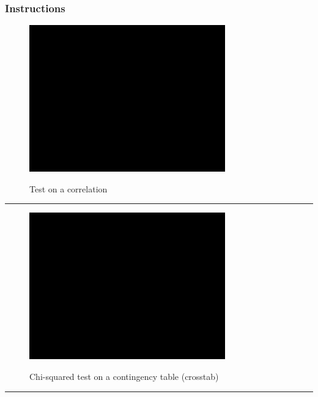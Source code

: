 \documentclass[a4paper]{book}
\theoremstyle{definition}
\theoremstyle{definition}
\theoremstyle{definition}
\theoremstyle{remark}
\begin{document}
\subsubsection*{Instructions}\label{instructions-13}

\begin{figure}[H]
\href{https://www.youtube.com/embed/2g3Oyfe76h0}{\includegraphics[width=320px]{GentleIntro_files/figure-latex/SPSScorrelation-1} }\caption{Test on a correlation}\label{fig:SPSScorrelation}
\end{figure}

\begin{center}\rule{0.5\linewidth}{\linethickness}\end{center}

\begin{figure}[H]
\href{https://www.youtube.com/embed/Nqtg8q-S0k8}{\includegraphics[width=320px]{GentleIntro_files/figure-latex/SPSSchisqcross-1} }\caption{Chi-squared test on a contingency table (crosstab)}\label{fig:SPSSchisqcross}
\end{figure}

\begin{center}\rule{0.5\linewidth}{\linethickness}\end{center}
\end{document}

